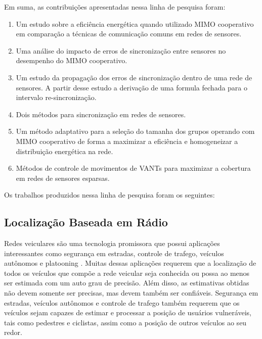 \documentclass[12pt]{article}
\begin{document}
Em suma, as contribuições apresentadas nessa linha de pesquisa foram:
\begin{enumerate}
\item Um estudo sobre a eficiência energética quando utilizado MIMO cooperativo em comparação a técnicas de comunicação comuns em redes de sensores. 
\item Uma análise do impacto de erros de sincronização entre sensores no desempenho do MIMO cooperativo. 
\item Um estudo da propagação dos erros de sincronização dentro de uma rede de sensores. A partir desse estudo a derivação de uma formula fechada para o intervalo re-sincronização. 
\item Dois métodos para sincronização em redes de sensores.
\item Um método adaptativo para a seleção do tamanha dos grupos operando com MIMO cooperativo de forma a maximizar a eficiência e homogeneizar a distribuição energética na rede.
\item Métodos de controle de movimentos de VANTs para maximizar a cobertura em redes de sensores esparsas.
\end{enumerate}

Os trabalhos produzidos nessa linha de pesquisa foram os seguintes:



\subsection{Localização Baseada em Rádio}

Redes veiculares são uma tecnologia promissora que possui aplicações interessantes como segurança em estradas, controle de trafego, veículos autônomos e platooning \cite{kumar2013applications}. Muitas dessas aplicações requerem que a localização de todos os veículos que compõe a rede veicular seja conhecida ou possa ao menos ser estimada com um auto grau de precisão. Além disso, as estimativas obtidas não devem somente ser precisas, mas devem também ser confiáveis. Segurança em estradas, veículos autônomos e controle de trafego também requerem que os veículos sejam capazes de estimar e processar a posição de usuários vulneráveis, tais como pedestres e ciclistas, assim como a posição de outros veículos ao seu redor.
\end{document}
